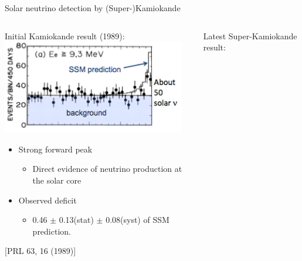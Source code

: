 \begin{frame}[t]{Solar neutrino detection by (Super-)Kamiokande}

\begin{columns}
  \begin{column}{0.52\textwidth}
    Initial Kamiokande result (1989):\\
     \includegraphics[width=0.95\textwidth]{./images/3nu/solar/kamiokande_solar_costheta.png}\\
    \vspace{0.1cm}
    \begin{itemize}
       \item Strong forward peak
       \begin{itemize}
         \item Direct evidence of neutrino production at the solar core
       \end{itemize}
       \item Observed deficit
       \begin{itemize}
         \item 0.46 $\pm$ 0.13(stat) $\pm$ 0.08(syst) of SSM prediction.\\
       \end{itemize}
    \end{itemize}
    \begin{center}
      {\scriptsize \color{blue}[PRL 63, 16 (1989)]\\}
    \end{center}
  \end{column}
  \begin{column}{0.48\textwidth}
     Latest Super-Kamiokande result:\\

\end{column}
\end{columns}
\end{frame}

